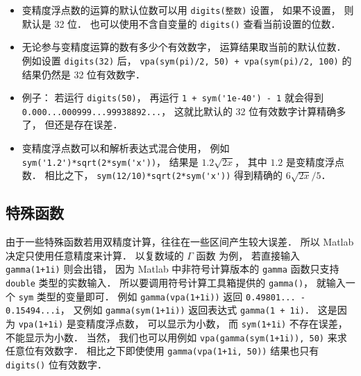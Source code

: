 \begin{itemize}
\item 变精度浮点数的运算的默认位数可以用 \verb|digits(整数)| 设置， 如果不设置， 则默认是 32 位． 也可以使用不含自变量的 \verb|digits()| 查看当前设置的位数．

\item 无论参与变精度运算的数有多少个有效数字， 运算结果取当前的默认位数． 例如设置 \verb|digits(32)| 后， \verb|vpa(sym(pi)/2, 50) + vpa(sym(pi)/2, 100)| 的结果仍然是 32 位有效数字．

\item 例子： 若运行 \verb|digits(50)|， 再运行 \verb|1 + sym('1e-40') - 1| 就会得到 \verb|0.000...000999...99938892...|， 这就比默认的 32 位有效数字计算精确多了， 但还是存在误差．

\item 变精度浮点数可以和解析表达式混合使用， 例如 \verb|sym('1.2')*sqrt(2*sym('x'))|， 结果是 $1.2 \sqrt{2x}$， 其中 $1.2$ 是变精度浮点数． 相比之下， \verb|sym(12/10)*sqrt(2*sym('x'))| 得到精确的 $6\sqrt{2x}/5$．
\end{itemize}

\subsection{特殊函数}
由于一些特殊函数若用双精度计算，往往在一些区间产生较大误差． 所以 Matlab 决定只使用任意精度来计算． 以复数域的 $\Gamma$ 函数 为例， 若直接输入 \verb|gamma(1+1i)| 则会出错， 因为 Matlab 中非符号计算版本的 \verb|gamma| 函数只支持 \verb|double| 类型的实数输入． 所以要调用符号计算工具箱提供的 \verb|gamma()|， 就输入一个 \verb|sym| 类型的变量即可． 例如 \verb|gamma(vpa(1+1i))| 返回 \verb|0.49801... - 0.15494...i|， 又例如 \verb|gamma(sym(1+1i))| 返回表达式 \verb|gamma(1 + 1i)|． 这是因为 \verb|vpa(1+1i)| 是变精度浮点数， 可以显示为小数， 而 \verb|sym(1+1i)| 不存在误差， 不能显示为小数． 当然， 我们也可以用例如 \verb|vpa(gamma(sym(1+1i)), 50)| 来求任意位有效数字． 相比之下即使使用 \verb|gamma(vpa(1+1i, 50))| 结果也只有 \verb|digits()| 位有效数字．
